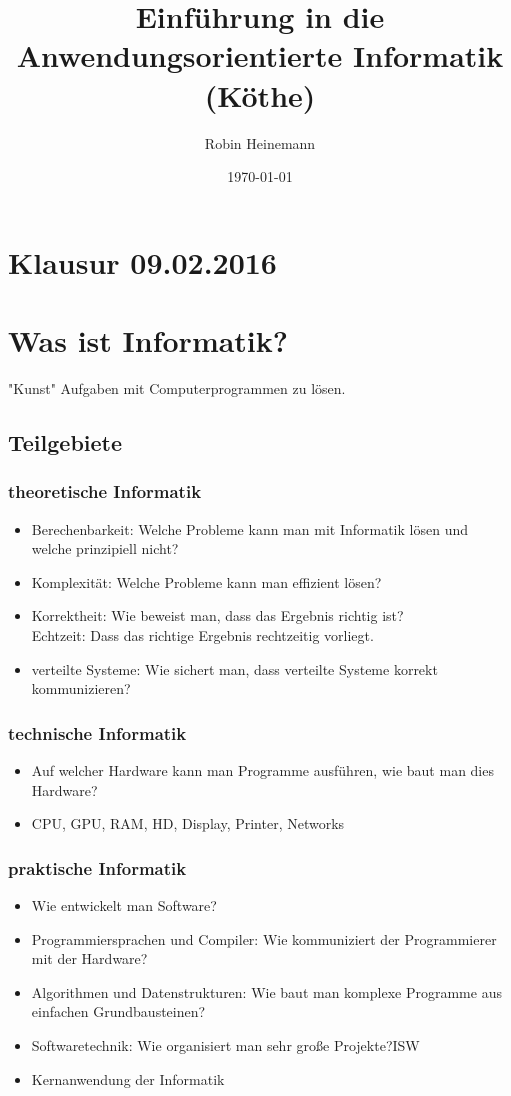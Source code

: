 \documentclass[11pt]{article}
\author{Robin Heinemann}
\date{\today}
\title{Einführung in die Anwendungsorientierte Informatik (Köthe)}
\begin{document}
\maketitle
\tableofcontents


\section{Klausur 09.02.2016}
\label{sec-1}

\section{Was ist Informatik?}
\label{sec-2}
"Kunst" Aufgaben mit Computerprogrammen zu lösen.
\subsection{Teilgebiete}
\label{sec-2-1}
\subsubsection{theoretische Informatik}
\label{sec-2-1-1}
\begin{itemize}
\item Berechenbarkeit: Welche Probleme kann man mit Informatik lösen und welche prinzipiell nicht?
\item Komplexität: Welche Probleme kann man effizient lösen?
\item Korrektheit: Wie beweist man, dass das Ergebnis richtig ist? \\
      Echtzeit: Dass das richtige Ergebnis rechtzeitig vorliegt.
\item verteilte Systeme: Wie sichert man, dass verteilte Systeme korrekt kommunizieren?
\end{itemize}
\subsubsection{technische Informatik}
\label{sec-2-1-2}
\begin{itemize}
\item Auf welcher Hardware kann man Programme ausführen, wie baut man dies Hardware?
\item CPU, GPU, RAM, HD, Display, Printer, Networks
\end{itemize}
\subsubsection{praktische Informatik}
\label{sec-2-1-3}
\begin{itemize}
\item Wie entwickelt man Software?
\item Programmiersprachen und Compiler: Wie kommuniziert der Programmierer mit der Hardware?
\item Algorithmen und Datenstrukturen: Wie baut man komplexe Programme aus einfachen Grundbausteinen?
\item Softwaretechnik: Wie organisiert man sehr große Projekte?\hfill ISW
\item Kernanwendung der Informatik
\end{itemize}
\end{document}
